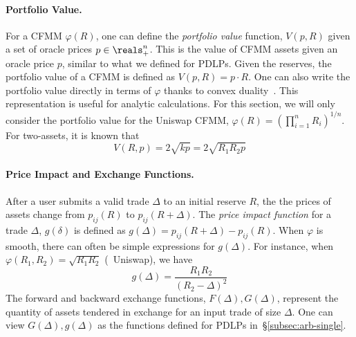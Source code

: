  
\paragraph{Portfolio Value.}
For a CFMM $\varphi(R)$, one can define the \emph{portfolio value} function, $V(p, R)$ given a set of oracle prices $p \in \reals^n_+$.
This is the value of CFMM assets given an oracle price $p$, similar to what we defined for PDLPs.
Given the reserves, the portfolio value of a CFMM is defined as $V(p, R) = p \cdot R$.
One can also write the portfolio value directly in terms of $\varphi$ thanks to convex duality~\cite{angeris2023geometry}.
This representation is useful for analytic calculations.
For this section, we will only consider the portfolio value for the Uniswap CFMM, $\varphi(R) = \left(\prod_{i=1}^n R_i\right)^{1/n}$.
For two-assets, it is known that~\cite{angeris2020improved}
\begin{equation}\label{eq:uni-pv}
V(R, p) = 2 \sqrt{k p} = 2\sqrt{R_1 R_2 p}
\end{equation}

\paragraph{Price Impact and Exchange Functions.}
After a user submits a valid trade $\Delta$ to an initial reserve $R$, the the prices of assets change from $p_{ij}(R)$ to $p_{ij}(R+\Delta)$.
The \emph{price impact function} for a trade $\Delta$, $g(\delta)$ is defined as $g(\Delta) = p_{ij}(R+\Delta)-p_{ij}(R)$.
When $\varphi$ is smooth, there can often be simple expressions for $g(\Delta)$.
For instance, when $\varphi(R_1, R_2) = \sqrt{R_1 R_2}$ (\ie~Uniswap), we have
\begin{equation}\label{eq:uniswap}
g(\Delta) = \frac{R_1 R_2}{(R_2-\Delta)^2}
\end{equation}
The forward and backward exchange functions, $F(\Delta), G(\Delta)$, represent the quantity of assets tendered in exchange for an input trade of size $\Delta$.
One can view $G(\Delta), g(\Delta)$ as the functions defined for PDLPs in~\S\ref{subsec:arb-single}.

